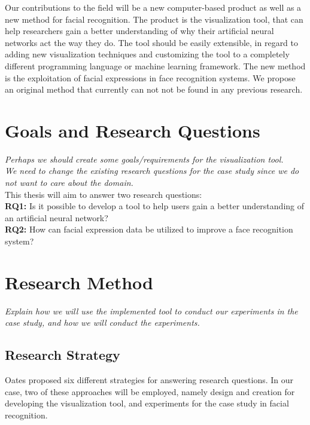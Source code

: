 \noindent Our contributions to the field will be a new computer-based product as well as a new method for facial recognition. The product is the visualization tool, that can help researchers gain a better understanding of why their artificial neural networks act the way they do. The tool should be easily extensible, in regard to adding new visualization techniques and customizing the tool to a completely different programming language or machine learning framework. The new method is the exploitation of facial expressions in face recognition systems. We propose an original method that currently can not not be found in any previous research.

\section{Goals and Research Questions}

\textit{Perhaps we should create some goals/requirements for the visualization tool. \\
We need to change the existing research questions for the case study since we do not want to care about the domain.}\\

\noindent This thesis will aim to answer two research questions: \\
\noindent\textbf{RQ1:} Is it possible to develop a tool to help users gain a better understanding of an artificial neural network? \\
\noindent\textbf{RQ2:} How can facial expression data be utilized to improve a face recognition system?

\section{Research Method}

\textit{Explain how we will use the implemented tool to conduct our experiments in the case study, and how we will conduct the experiments.}

\subsection{Research Strategy}

\noindent Oates proposed six different strategies for answering research questions. In our case, two of these approaches will be employed, namely design and creation for developing the visualization tool, and experiments for the case study in facial recognition. \\

